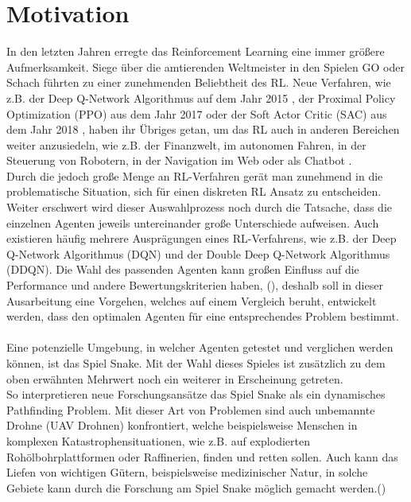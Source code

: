 \section{Motivation} \label{sec:Motivation}
In den letzten Jahren erregte das Reinforcement Learning eine immer größere Aufmerksamkeit. Siege über die amtierenden Weltmeister in den Spielen GO oder Schach führten zu einer zunehmenden Beliebtheit des RL. Neue Verfahren, wie z.B. der Deep Q-Network Algorithmus auf dem Jahr 2015 \cite{DQN}, der Proximal Policy Optimization (PPO) aus dem Jahr 2017 \cite{PPO} oder der Soft Actor Critic (SAC) aus dem Jahr 2018 \cite{SAC}, haben ihr Übriges getan, um das RL auch in anderen Bereichen weiter anzusiedeln, wie z.B. der Finanzwelt, im autonomen Fahren, in der Steuerung von Robotern, in der Navigation im Web oder als Chatbot \cite{DRL_Lapan}.\\
Durch die jedoch große Menge an RL-Verfahren gerät man zunehmend in die problematische Situation, sich für einen diskreten RL Ansatz zu entscheiden. Weiter erschwert wird dieser Auswahlprozess noch durch die Tatsache, dass die einzelnen Agenten jeweils untereinander große Unterschiede aufweisen. Auch existieren häufig mehrere Ausprägungen eines RL-Verfahrens, wie z.B. der Deep Q-Network Algorithmus (DQN) und der Double Deep Q-Network Algorithmus (DDQN). Die Wahl des passenden Agenten kann großen Einfluss auf die Performance und andere Bewertungskriterien haben, (\cite{Exploration_of_Reinforcement_Learning_to_SNAKE}), deshalb soll in dieser Ausarbeitung eine Vorgehen, welches auf einem Vergleich beruht, entwickelt werden, dass den optimalen Agenten für eine entsprechendes Problem bestimmt.\\
\\Eine potenzielle Umgebung, in welcher Agenten getestet und verglichen werden können, ist das Spiel Snake.
Mit der Wahl dieses Spieles ist zusätzlich zu dem oben erwähnten Mehrwert noch ein weiterer in Erscheinung getreten.\\ 
So interpretieren neue Forschungsansätze das Spiel Snake als ein dynamisches Pathfinding Problem. Mit dieser Art von Problemen sind auch unbemannte Drohne (UAV Drohnen) konfrontiert, welche beispielsweise Menschen in komplexen Katastrophensituationen, wie z.B. auf explodierten Rohölbohrplattformen oder Raffinerien, finden und retten sollen. Auch kann das Liefen von wichtigen Gütern, beispielsweise medizinischer Natur, in solche Gebiete kann durch die Forschung am Spiel Snake möglich gemacht werden.(\cite{UAV})

